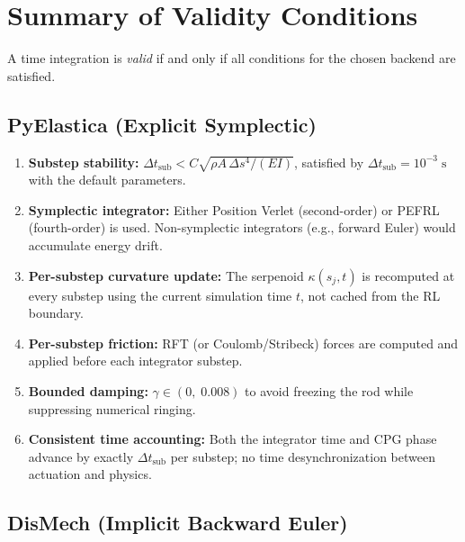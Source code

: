 \documentclass[11pt]{article}
\newcommand{\dtsub}{\Delta t_{\mathrm{sub}}}
\begin{document}
\section{Summary of Validity Conditions}
\label{sec:summary}

A time integration is \emph{valid} if and only if all conditions for the
chosen backend are satisfied.

\subsection{PyElastica (Explicit Symplectic)}

\begin{enumerate}
  \item \textbf{Substep stability:} $\dtsub < C\sqrt{\rho A \,\Delta s^4 / (EI)}$,
        satisfied by $\dtsub = 10^{-3}\;\mathrm{s}$ with the default parameters.

  \item \textbf{Symplectic integrator:} Either Position Verlet (second-order)
        or PEFRL (fourth-order) is used.  Non-symplectic integrators
        (e.g., forward Euler) would accumulate energy drift.

  \item \textbf{Per-substep curvature update:} The serpenoid
        $\kappa(s_j, t)$ is recomputed at every substep using the
        current simulation time $t$, not cached from the RL boundary.

  \item \textbf{Per-substep friction:} RFT (or Coulomb/Stribeck) forces
        are computed and applied before each integrator substep.

  \item \textbf{Bounded damping:} $\gamma \in (0,\; 0.008)$ to avoid
        freezing the rod while suppressing numerical ringing.

  \item \textbf{Consistent time accounting:} Both the integrator time
        and CPG phase advance by exactly $\dtsub$ per substep; no
        time desynchronization between actuation and physics.
\end{enumerate}

\subsection{DisMech (Implicit Backward Euler)}
\end{document}
